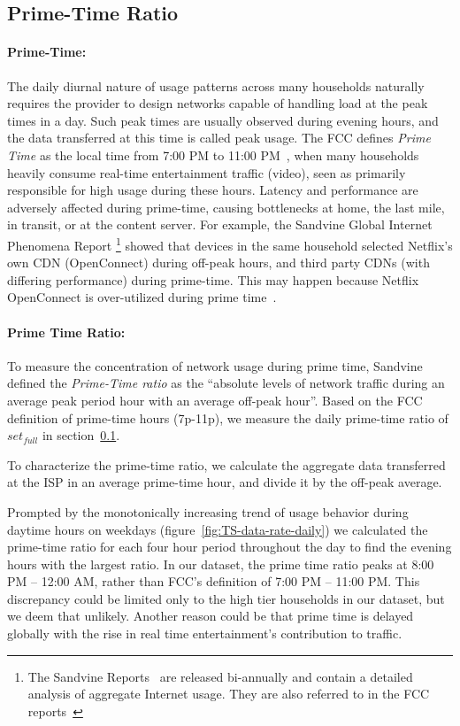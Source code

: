 \subsection{Prime-Time Ratio} \label{subsec:primetime}

\paragraph{Prime-Time: }The daily diurnal nature of usage patterns across many
households naturally requires the provider to design networks capable of handling 
load at the peak times in a day. Such peak times are usually observed during
evening hours, and the data transferred at this time is called peak usage.
The FCC defines \emph{Prime Time} as the local time from 7:00 PM to 11:00
PM~\cite{fcc2014measuring-broadband}, when many
households heavily consume real-time entertainment traffic (video), seen as primarily
responsible for high usage during these hours. Latency and performance are adversely
affected during prime-time, causing bottlenecks at home, the last mile, in
transit, or at the content server. For example, the Sandvine Global
Internet Phenomena Report \footnote{The Sandvine Reports ~\cite{sandvine20141h,
sandvine20142h}are released bi-annually and
contain a detailed analysis of aggregate Internet usage. They are also referred
to in the FCC reports~\cite{fcc2015progress-report, fcc2014measuring-broadband,
fcc2014progress-report}} showed that devices in the same household selected Netflix's
own CDN (OpenConnect) during off-peak hours, and third party CDNs (with differing
performance) during prime-time. This may happen because Netflix OpenConnect is over-utilized
during prime time~\cite{sandvine20141h}.

\paragraph{Prime Time Ratio: }To measure the concentration of network usage during prime time,
Sandvine defined the \emph{Prime-Time ratio} as the ``absolute levels of network traffic
during an average peak period hour with an average off-peak hour''. Based on the FCC
definition of prime-time hours (7p-11p), we measure the daily prime-time ratio of $set_{full}$
in section~\ref{subsec:primetime}.

To characterize the prime-time ratio, we
calculate the aggregate data transferred at the ISP in an average prime-time hour,
and divide it by the off-peak average.

Prompted by the monotonically increasing trend of usage behavior during daytime hours on
weekdays (figure~\ref{fig:TS-data-rate-daily})
we calculated the prime-time ratio for each four hour period throughout the day
to find the evening hours with the largest ratio.
In our dataset, the prime time ratio peaks at 8:00 PM -- 12:00 AM,
rather than FCC's definition of 7:00 PM -- 11:00 PM. This discrepancy could be limited
only to the high tier households in our dataset, but we deem that unlikely.
Another reason could be that prime time is delayed globally with the rise in real
time entertainment's contribution to traffic.

